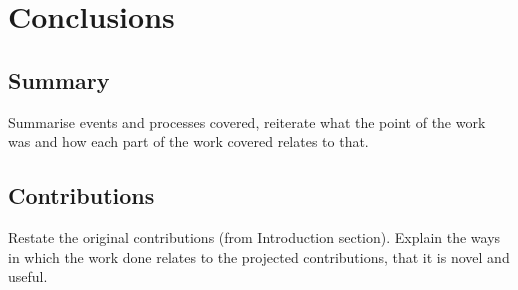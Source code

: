 \section{Conclusions}
\subsection{Summary}
Summarise events and processes covered, reiterate what the point of the work was and how each part of the work covered relates to that.

\subsection{Contributions}
Restate the original contributions (from Introduction section). Explain the ways in which the work done relates to the projected contributions, that it is novel and useful.